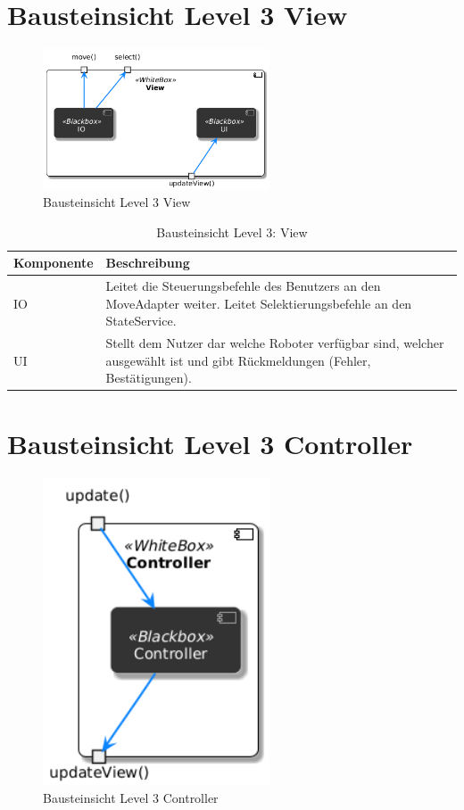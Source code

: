 \section{Bausteinsicht Level 3 View}
\begin{figure}[h] %
    \centering
    \includegraphics[width=0.6\textwidth]{diagrams/baustein_lvl_3_view_final.png}
    \caption{Bausteinsicht Level 3 View}
\end{figure}

\begin{table}[h!]
\centering
\begin{tabular}{|p{4cm}|p{9cm}|}
\hline
\textbf{Komponente} & \textbf{Beschreibung} \\ \hline
IO & Leitet die Steuerungsbefehle des Benutzers an den MoveAdapter weiter. Leitet Selektierungsbefehle an den StateService. \\ \hline
UI  & Stellt dem Nutzer dar welche Roboter verfügbar sind, welcher ausgewählt ist und gibt Rückmeldungen (Fehler, Bestätigungen).\\ \hline
\end{tabular}
\caption{Bausteinsicht Level 3: View}
\label{tab:lvl3}
\end{table}

\section{Bausteinsicht Level 3 Controller}
\begin{figure}[h] %
    \centering
    \includegraphics[width=0.6\textwidth]{diagrams/baustein_lvl_3_controller_final.png}
    \caption{Bausteinsicht Level 3 Controller}
\end{figure}

